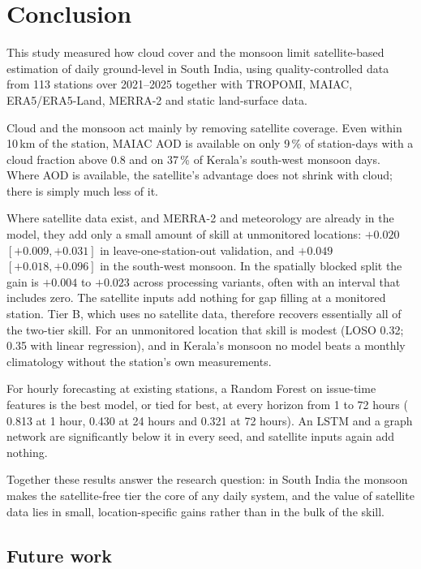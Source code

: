 \chapter{Conclusion}

This study measured how cloud cover and the monsoon limit satellite-based estimation of daily
ground-level \pmtf{} in South India, using quality-controlled data from 113 stations over 2021--2025
together with TROPOMI, MAIAC, ERA5/ERA5-Land, MERRA-2 and static land-surface data.

Cloud and the monsoon act mainly by removing satellite coverage. Even within 10\,km of the station,
MAIAC AOD is available on only 9\,\% of station-days with a cloud fraction above 0.8 and on 37\,\% of
Kerala's south-west monsoon days. Where AOD is available, the satellite's advantage does not shrink
with cloud; there is simply much less of it.

Where satellite data exist, and MERRA-2 and meteorology are already in the model, they add only a
small amount of skill at unmonitored locations: $+0.020$ \rsq{} $[+0.009, +0.031]$ in
leave-one-station-out validation, and $+0.049$ $[+0.018, +0.096]$ in the south-west monsoon. In the
spatially blocked split the gain is $+0.004$ to $+0.023$ across processing variants, often with an
interval that includes zero. The satellite inputs add nothing for gap filling at a monitored
station. Tier B, which uses no satellite data, therefore recovers essentially all of the two-tier
skill. For an unmonitored location that skill is modest (LOSO \rsq{} 0.32; 0.35 with linear
regression), and in Kerala's monsoon
no model beats a monthly climatology without the station's own measurements.

For hourly forecasting at existing stations, a Random Forest on issue-time features is the best
model, or tied for best, at every horizon from 1 to 72 hours (\rsq{} 0.813 at 1 hour, 0.430 at 24 hours and 0.321 at
72 hours). An LSTM and a graph network are significantly below it in every seed, and satellite
inputs again add nothing.

Together these results answer the research question: in South India the monsoon makes the
satellite-free tier the core of any daily \pmtf{} system, and the value of satellite data lies in
small, location-specific gains rather than in the bulk of the skill.

\section{Future work}

